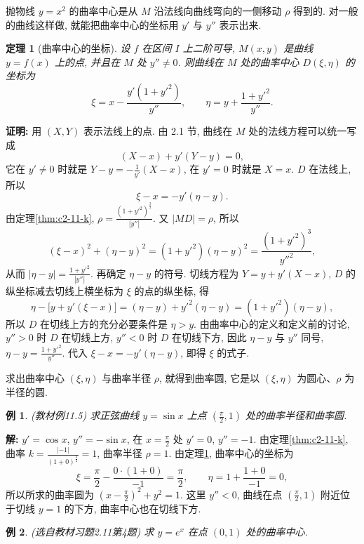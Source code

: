 \documentclass[UTF8,openany]{ctexbook}
\theoremstyle{chinesetextbook}
\newtheorem{example}{例}[section]
\newtheorem{theorem}{定理}[section]
\newenvironment{cnproof}{\par\indent\textbf{证明:} \ignorespaces}{\par}
\newenvironment{cnsolution}{\par\indent\textbf{解:} \ignorespaces}{\par}
\begin{document}
抛物线 $y=x^2$ 的曲率中心是从 $M$ 沿法线向曲线弯向的一侧移动 $\rho$ 得到的. 对一般的曲线这样做, 就能把曲率中心的坐标用 $y'$ 与 $y''$ 表示出来.
\begin{theorem}[曲率中心的坐标]\label{thm:c2-11-center}
设 $f$ 在区间 $I$ 上二阶可导, $M(x,y)$ 是曲线 $y=f(x)$ 上的点, 并且在 $M$ 处 $y''\ne0$. 则曲线在 $M$ 处的曲率中心 $D(\xi,\eta)$ 的坐标为
\[
\xi=x-\frac{y'(1+y'^2)}{y''},\qquad\eta=y+\frac{1+y'^2}{y''}.
\]
\end{theorem}
\begin{cnproof}
用 $(X,Y)$ 表示法线上的点. 由 2.1 节, 曲线在 $M$ 处的法线方程可以统一写成
\[
(X-x)+y'(Y-y)=0,
\]
它在 $y'\ne0$ 时就是 $\displaystyle Y-y=-\frac1{y'}(X-x)$, 在 $y'=0$ 时就是 $X=x$. $D$ 在法线上, 所以
\[
\xi-x=-y'(\eta-y).
\]
由定理\ref{thm:c2-11-k}, $\displaystyle\rho=\frac{(1+y'^2)^{\frac32}}{|y''|}$. 又 $|MD|=\rho$, 所以
\[
(\xi-x)^2+(\eta-y)^2=(1+y'^2)(\eta-y)^2=\frac{(1+y'^2)^3}{y''^2},
\]
从而 $\displaystyle|\eta-y|=\frac{1+y'^2}{|y''|}$. 再确定 $\eta-y$ 的符号. 切线方程为 $Y=y+y'(X-x)$, $D$ 的纵坐标减去切线上横坐标为 $\xi$ 的点的纵坐标, 得
\[
\eta-\bigl[y+y'(\xi-x)\bigr]=(\eta-y)+y'^2(\eta-y)=(1+y'^2)(\eta-y),
\]
所以 $D$ 在切线上方的充分必要条件是 $\eta>y$. 由曲率中心的定义和定义前的讨论, $y''>0$ 时 $D$ 在切线上方, $y''<0$ 时 $D$ 在切线下方, 因此 $\eta-y$ 与 $y''$ 同号, $\displaystyle\eta-y=\frac{1+y'^2}{y''}$. 代入 $\xi-x=-y'(\eta-y)$, 即得 $\xi$ 的式子.
\end{cnproof}
求出曲率中心 $(\xi,\eta)$ 与曲率半径 $\rho$, 就得到曲率圆, 它是以 $(\xi,\eta)$ 为圆心、$\rho$ 为半径的圆.
\begin{example}\label{ex:c2-11-5}
\textnormal{(教材例11.5)} 求正弦曲线 $y=\sin x$ 上点 $\displaystyle\left(\frac\pi2,1\right)$ 处的曲率半径和曲率圆.
\end{example}
\begin{cnsolution}
$y'=\cos x$, $y''=-\sin x$, 在 $\displaystyle x=\frac\pi2$ 处 $y'=0$, $y''=-1$. 由定理\ref{thm:c2-11-k}, 曲率 $\displaystyle k=\frac{|-1|}{(1+0)^{\frac32}}=1$, 曲率半径 $\rho=1$. 由定理\ref{thm:c2-11-center}, 曲率中心的坐标为
\[
\xi=\frac\pi2-\frac{0\cdot(1+0)}{-1}=\frac\pi2,\qquad\eta=1+\frac{1+0}{-1}=0,
\]
所以所求的曲率圆为 $\displaystyle\left(x-\frac\pi2\right)^2+y^2=1$. 这里 $y''<0$, 曲线在点 $\displaystyle\left(\frac\pi2,1\right)$ 附近位于切线 $y=1$ 的下方, 曲率中心也在切线下方.
\end{cnsolution}
\begin{example}\label{ex:c2-h11-4}
\textnormal{(选自教材习题2.11第4题)} 求 $y=e^x$ 在点 $(0,1)$ 处的曲率中心.
\end{example}
\end{document}
